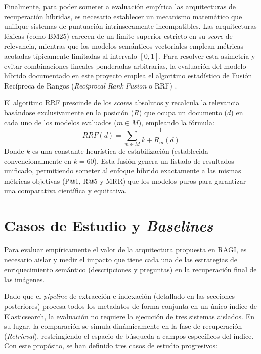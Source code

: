\documentclass[a4paper]{report}
\begin{document}
Finalmente, para poder someter a evaluación empírica las arquitecturas de recuperación híbridas, es necesario establecer un mecanismo matemático que unifique sistemas de puntuación intrínsecamente incompatibles. Las arquitecturas léxicas (como BM25) carecen de un límite superior estricto en su \textit{score} de relevancia, mientras que los modelos semánticos vectoriales emplean métricas acotadas típicamente limitadas al intervalo $[0, 1]$. Para resolver esta asimetría y evitar combinaciones lineales ponderadas arbitrarias, la evaluación del modelo híbrido documentado en este proyecto emplea el algoritmo estadístico de Fusión Recíproca de Rangos (\textit{Reciprocal Rank Fusion} o RRF) \cite{cormack2009reciprocal}. 

El algoritmo RRF prescinde de los \textit{scores} absolutos y recalcula la relevancia basándose exclusivamente en la posición ($R$) que ocupa un documento ($d$) en cada uno de los modelos evaluados ($m \in M$), empleando la fórmula:
\begin{equation}
    RRF(d) = \sum_{m \in M} \frac{1}{k + R_{m}(d)}
\end{equation}
Donde $k$ es una constante heurística de estabilización (establecida convencionalmente en $k=60$). Esta fusión genera un listado de resultados unificado, permitiendo someter al enfoque híbrido exactamente a las mismas métricas objetivas (P@1, R@5 y MRR) que los modelos puros para garantizar una comparativa científica y equitativa.

\section{Casos de Estudio y \textit{Baselines}}
\label{sec:metodologia_baselines}

Para evaluar empíricamente el valor de la arquitectura propuesta en RAGI, es necesario aislar y medir el impacto que tiene cada una de las estrategias de enriquecimiento semántico (descripciones y preguntas) en la recuperación final de las imágenes. 

Dado que el \textit{pipeline} de extracción e indexación (detallado en las secciones posteriores) procesa todos los metadatos de forma conjunta en un único índice de Elasticsearch, la evaluación no requiere la ejecución de tres sistemas aislados. En su lugar, la comparación se simula dinámicamente en la fase de recuperación (\textit{Retrieval}), restringiendo el espacio de búsqueda a campos específicos del índice. Con este propósito, se han definido tres casos de estudio progresivos:
\end{document}

